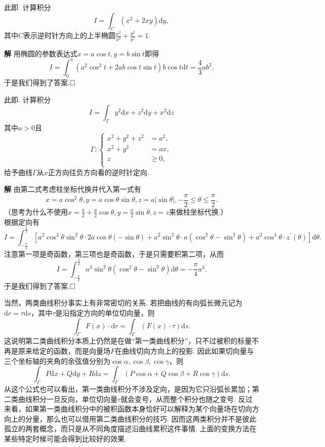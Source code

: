 \documentclass{ctexart}
\newenvironment{custom}[1]{\par\noindent \textbf{#1}\quad}{\par\vspace{1em}}
\begin{document}
\begin{example}
此即\cite[例题24.2.1]{XHM}. 计算积分
$$I=\int_{C}{(x^{2}+2xy)\mathrm{d}y},$$
其中$C$表示逆时针方向上的上半椭圆$\frac{x^{2}}{a^{2}}+\frac{y^{2}}{b^{2}}=1$.
\end{example}

\begin{custom}{解}
用椭圆的参数表达式$x=a\cos{t},y=b\sin{t}$即得
$$I=\int_{0}^{\pi}{(a^{2}\cos^{2}{t}+2ab\cos{t}\sin{t})b\cos{t}\mathrm{d}t}=\frac{4}{3}ab^{2}.$$
于是我们得到了答案.$\hfill{\square}$
\end{custom}

\begin{example}
此即\cite[例题24.2.2]{XHM}. 计算积分
$$I=\int_{\Gamma}{y^{2}\mathrm{d}x+z^{2}\mathrm{d}y+x^{2}\mathrm{d}z}$$
其中$a>0$且
$$\Gamma:\left\{\begin{aligned}x^{2}+y^{2}+z^{2}&=a^{2},\\ x^{2}+y^{2}&=ax,\\ z&\geqslant 0,\\\end{aligned}\right.$$
给予曲线$\Gamma$从$x$正方向往负方向看的逆时针定向.
\end{example}

\begin{custom}{解}
由第二式考虑柱坐标代换并代入第一式有
$$x=a\cos^{2}{\theta},y=a\cos{\theta}\sin{\theta},z=a|\sin{\theta}|,-\frac{\pi}{2}\leqslant \theta\leqslant\frac{\pi}{2}.$$
{\color{red}（思考为什么不使用$x=\frac{a}{2}+\frac{a}{2}\cos{\theta},y=\frac{a}{2}\sin{\theta},z=z$来做柱坐标代换.）}\\
根据定向有
$$I=\int_{-\frac{\pi}{2}}^{\frac{\pi}{2}}{[a^{2}\cos^{2}{\theta}\sin^{2}{\theta}\cdot 2a\cos{\theta}(-\sin{\theta})+a^{2}\sin^{2}{\theta}\cdot a(\cos^{2}{\theta}-\sin^{2}{\theta})+a^{2}\cos^{4}{\theta}\cdot z^{\prime}(\theta)]\mathrm{d}\theta}.$$
注意第一项是奇函数，第三项也是奇函数，于是只需要积第二项，从而
$$I=\int_{-\frac{\pi}{2}}^{\frac{\pi}{2}}{a^{3}\sin^{2}{\theta}(\cos^{2}{\theta}-\sin^{2}{\theta})\mathrm{d}\theta}=-\frac{\pi}{4}a^{3}.$$
于是我们得到了答案.$\hfill{\square}$
\end{custom}

当然，两类曲线积分事实上有非常密切的关系. 若把曲线的有向弧长微元记为$\mathrm{d}r=\tau\mathrm{d}s$，其中$\tau$是沿指定方向的单位切向量，则
$$\int_{\Gamma}{F(x)\cdot\mathrm{d}r}=\int_{\Gamma}{(F(x)\cdot\tau)\mathrm{d}s}.$$
这说明第二类曲线积分本质上仍然是在做“第一类曲线积分”，只不过被积的标量不再是原来给定的函数，而是向量场$F$在曲线切向方向上的投影. 因此如果切向量与三个坐标轴的夹角的余弦值分别为$\cos{\alpha},\cos{\beta},\cos{\gamma}$，则
$$\int_{\Gamma}{P\mathrm{d}x+Q\mathrm{d}y+R\mathrm{d}z}=\int_{\Gamma}{(P\cos{\alpha}+Q\cos{\beta}+R\cos{\gamma})\mathrm{d}s}.$$
从这个公式也可以看出，第一类曲线积分不涉及定向，是因为它只沿弧长累加；第二类曲线积分一旦反向，单位切向量$\tau$就会变号，从而整个积分也随之变号. 反过来看，如果第一类曲线积分中的被积函数本身恰好可以解释为某个向量场在切向方向上的分量，那么也可以借用第二类曲线积分的技巧. 因而这两类积分并不是彼此孤立的两套概念，而只是从不同角度描述沿曲线累积这件事情. 上面的变换方法在某些特定时候可能会得到比较好的效果.
\end{document}
